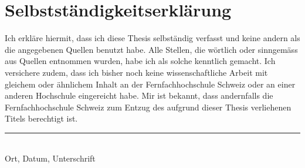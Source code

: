 \documentclass[main.tex]{subfiles}
\begin{document}
\chapter*{Selbstständigkeitserklärung}
Ich erkläre hiermit, dass ich diese Thesis selbständig verfasst und keine andern als die angegebenen Quellen benutzt habe. Alle Stellen, die wörtlich oder sinngemäss aus Quellen entnommen wurden, habe ich als solche kenntlich gemacht. Ich versichere zudem, dass ich bisher noch keine wissenschaftliche Arbeit mit gleichem oder ähnlichem Inhalt an der Fernfachhochschule Schweiz oder an einer anderen Hochschule eingereicht habe. Mir ist bekannt, dass andernfalls die Fernfachhochschule Schweiz zum Entzug des aufgrund dieser Thesis verliehenen Titels berechtigt ist.

\vspace{4cm}
\noindent
\hrule \ \\[-0.5ex]
Ort, Datum, Unterschrift
\end{document}
